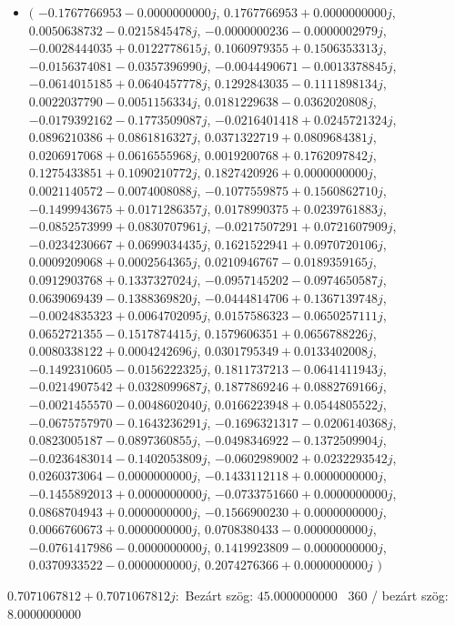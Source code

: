 \documentclass[14pt,a4paper]{article}
\begin{document}
\begin{itemize}
\item
$\big($
$-0.1767766953-0.0000000000j$, $0.1767766953+0.0000000000j$, $0.0050638732-0.0215845478j$, $-0.0000000236-0.0000002979j$, $-0.0028444035+0.0122778615j$, $0.1060979355+0.1506353313j$, $-0.0156374081-0.0357396990j$, $-0.0044490671-0.0013378845j$, $-0.0614015185+0.0640457778j$, $0.1292843035-0.1111898134j$, $0.0022037790-0.0051156334j$, $0.0181229638-0.0362020808j$, $-0.0179392162-0.1773509087j$, $-0.0216401418+0.0245721324j$, $0.0896210386+0.0861816327j$, $0.0371322719+0.0809684381j$, $0.0206917068+0.0616555968j$, $0.0019200768+0.1762097842j$, $0.1275433851+0.1090210772j$, $0.1827420926+0.0000000000j$, $0.0021140572-0.0074008088j$, $-0.1077559875+0.1560862710j$, $-0.1499943675+0.0171286357j$, $0.0178990375+0.0239761883j$, $-0.0852573999+0.0830707961j$, $-0.0217507291+0.0721607909j$, $-0.0234230667+0.0699034435j$, $0.1621522941+0.0970720106j$, $0.0009209068+0.0002564365j$, $0.0210946767-0.0189359165j$, $0.0912903768+0.1337327024j$, $-0.0957145202-0.0974650587j$, $0.0639069439-0.1388369820j$, $-0.0444814706+0.1367139748j$, $-0.0024835323+0.0064702095j$, $0.0157586323-0.0650257111j$, $0.0652721355-0.1517874415j$, $0.1579606351+0.0656788226j$, $0.0080338122+0.0004242696j$, $0.0301795349+0.0133402008j$, $-0.1492310605-0.0156222325j$, $0.1811737213-0.0641411943j$, $-0.0214907542+0.0328099687j$, $0.1877869246+0.0882769166j$, $-0.0021455570-0.0048602040j$, $0.0166223948+0.0544805522j$, $-0.0675757970-0.1643236291j$, $-0.1696321317-0.0206140368j$, $0.0823005187-0.0897360855j$, $-0.0498346922-0.1372509904j$, $-0.0236483014-0.1402053809j$, $-0.0602989002+0.0232293542j$, $0.0260373064-0.0000000000j$, $-0.1433112118+0.0000000000j$, $-0.1455892013+0.0000000000j$, $-0.0733751660+0.0000000000j$, $0.0868704943+0.0000000000j$, $-0.1566900230+0.0000000000j$, $0.0066760673+0.0000000000j$, $0.0708380433-0.0000000000j$, $-0.0761417986-0.0000000000j$, $0.1419923809-0.0000000000j$, $0.0370933522-0.0000000000j$, $0.2074276366+0.0000000000j$
$\big)$
\end{itemize}
$0.7071067812+0.7071067812j$:\
Bezárt szög: $45.0000000000$ \
360 / bezárt szög: $8.0000000000$\
\end{document}
